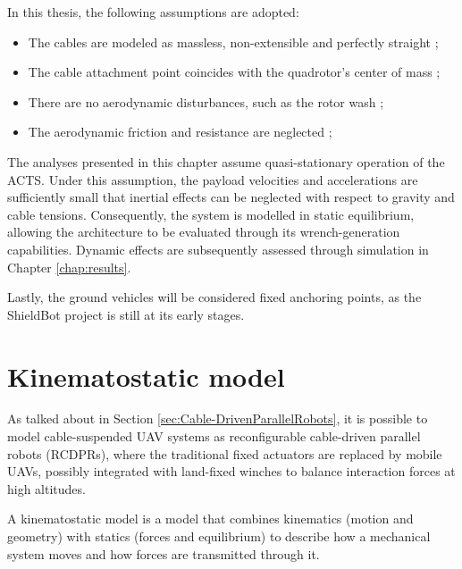 In this thesis, the following assumptions are adopted:

\begin{itemize}
    \item The cables are modeled as massless, non-extensible and perfectly straight \cite{erskine_control_2019, erskine_wrench_2019, sanalitro_indirect_2022};
    \item The cable attachment point coincides with the quadrotor's center of mass \cite{six_dynamic_2021, erskine_wrench_2019, liu_wrench_2022};
    \item There are no aerodynamic disturbances, such as the rotor wash \cite{six_dynamic_2021, liu_wrench_2022, erskine_dynamic_2021};
    \item The aerodynamic friction and resistance are neglected \cite{erskine_wrench_2019, forte_impedance_2012};
\end{itemize}

The analyses presented in this chapter assume quasi-stationary operation of the ACTS. Under this assumption, the payload velocities and accelerations are sufficiently small that inertial effects can be neglected with respect to gravity and cable tensions. Consequently, the system is modelled in static equilibrium, allowing the architecture to be evaluated through its wrench-generation capabilities. Dynamic effects are subsequently assessed through simulation in Chapter \ref{chap:results}.

Lastly, the ground vehicles will be considered fixed anchoring points, as the ShieldBot project is still at its early stages.

\section{Kinematostatic model}
As talked about in Section \ref{sec:Cable-DrivenParallelRobots}, it is possible to model cable-suspended UAV systems as reconfigurable cable-driven parallel robots (RCDPRs), where the traditional fixed actuators are replaced by mobile UAVs, possibly integrated with land-fixed winches to balance interaction forces at high altitudes.

A kinematostatic model is a model that combines kinematics (motion and geometry) with statics (forces and equilibrium) to describe how a mechanical system moves and how forces are transmitted through it.

